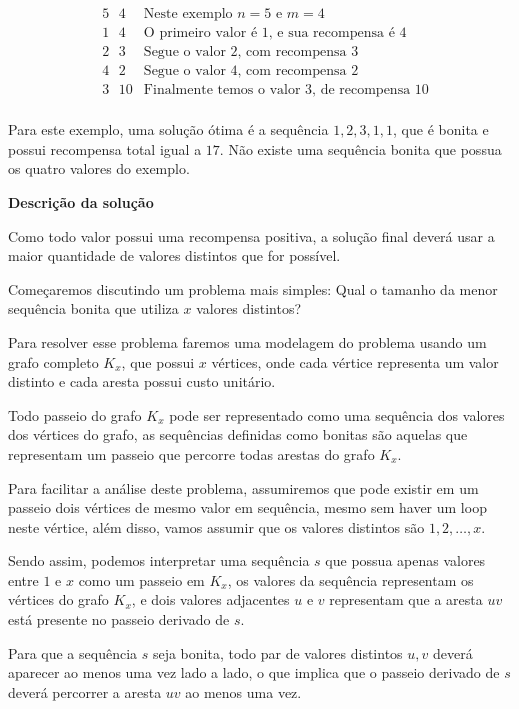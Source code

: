\documentclass[12pt, a4paper]{article}
\begin{document}
        \begin{align*}
            & 5 \text{ }4 & \text{Neste exemplo $n = 5$ e $m = 4$}\\
            & 1 \text{ }4 & \text{O primeiro valor é 1, e sua recompensa é 4}\\
            & 2 \text{ }3 & \text{Segue o valor 2, com recompensa 3}\\
            & 4 \text{ }2 & \text{Segue o valor 4, com recompensa 2}\\
            & 3 \text{ }10 &\text{Finalmente temos o valor 3, de recompensa 10}\\
        \end{align*}

        Para este exemplo, uma solução ótima é a sequência $1,2,3,1,1$, que é bonita e possui recompensa total igual a $17$. 
        Não existe uma sequência bonita que possua os quatro valores do exemplo.


        \textbf{Descrição da solução}

        Como todo valor possui uma recompensa positiva, a solução final deverá usar a maior quantidade de valores distintos que for possível.

        Começaremos discutindo um problema mais simples: Qual o tamanho da menor sequência bonita que utiliza $x$ valores distintos?

        Para resolver esse problema faremos uma modelagem do problema usando um grafo completo $K_x$, que possui $x$ vértices, onde cada vértice representa um valor distinto e cada aresta possui custo unitário.

        Todo passeio do grafo $K_x$ pode ser representado como uma sequência dos valores dos vértices do grafo, as sequências definidas como bonitas são aquelas que representam um passeio que percorre todas arestas do grafo $K_x$.

        Para facilitar a análise deste problema, assumiremos que pode existir em um passeio dois vértices de mesmo valor em sequência, mesmo sem haver um loop neste vértice, além disso, vamos assumir que os valores distintos são $1, 2, \dots, x$.

        Sendo assim, podemos interpretar uma sequência $s$ que possua apenas valores entre $1$ e $x$ como um passeio em $K_x$, os valores da sequência representam os vértices do grafo $K_x$, e dois valores adjacentes $u$ e $v$ representam que a aresta $uv$ está presente no passeio derivado de $s$. 
        
        Para que a sequência $s$ seja bonita, todo par de valores distintos $u, v$ deverá aparecer ao menos uma vez lado a lado, o que implica que o passeio derivado de $s$ deverá percorrer a aresta $uv$ ao menos uma vez.
\end{document}
